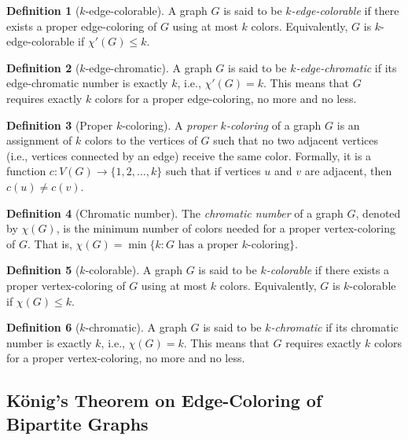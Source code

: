 \documentclass{article}
\theoremstyle{definition}
\newtheorem{definition}{Definition}
\begin{document}
\begin{definition}[$k$-edge-colorable]
A graph $G$ is said to be \emph{$k$-edge-colorable} if there exists a proper edge-coloring of $G$ using at most $k$ colors. Equivalently, $G$ is $k$-edge-colorable if $\chi'(G) \leq k$.
\end{definition}

\begin{definition}[$k$-edge-chromatic]
A graph $G$ is said to be \emph{$k$-edge-chromatic} if its edge-chromatic number is exactly $k$, i.e., $\chi'(G) = k$. This means that $G$ requires exactly $k$ colors for a proper edge-coloring, no more and no less.
\end{definition}

\begin{definition}[Proper $k$-coloring]
A \emph{proper $k$-coloring} of a graph $G$ is an assignment of $k$ colors to the vertices of $G$ such that no two adjacent vertices (i.e., vertices connected by an edge) receive the same color. Formally, it is a function $c: V(G) \rightarrow \{1,2,\ldots,k\}$ such that if vertices $u$ and $v$ are adjacent, then $c(u) \neq c(v)$.
\end{definition}

\begin{definition}[Chromatic number]
The \emph{chromatic number} of a graph $G$, denoted by $\chi(G)$, is the minimum number of colors needed for a proper vertex-coloring of $G$. That is, $\chi(G) = \min\{k : G \text{ has a proper $k$-coloring}\}$.
\end{definition}

\begin{definition}[$k$-colorable]
A graph $G$ is said to be \emph{$k$-colorable} if there exists a proper vertex-coloring of $G$ using at most $k$ colors. Equivalently, $G$ is $k$-colorable if $\chi(G) \leq k$.
\end{definition}

\begin{definition}[$k$-chromatic]
A graph $G$ is said to be \emph{$k$-chromatic} if its chromatic number is exactly $k$, i.e., $\chi(G) = k$. This means that $G$ requires exactly $k$ colors for a proper vertex-coloring, no more and no less.
\end{definition}


\subsection{König's Theorem on Edge-Coloring of Bipartite Graphs}
\end{document}
